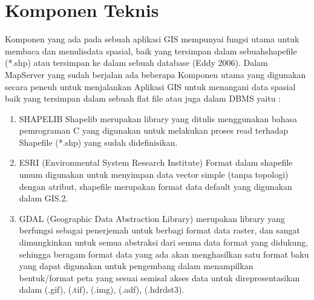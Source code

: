 \section{Komponen Teknis}
Komponen yang ada pada sebuah aplikasi GIS mempunyai fungsi utama untuk membaca dan menulisdata spasial, baik yang tersimpan dalam sebuahshapefile (*.shp) atau tersimpan ke dalam sebuah database (Eddy 2006).
Dalam MapServer yang sudah berjalan ada beberapa Komponen utama yang digunakan secara peneuh untuk menjalankan Aplikasi GIS untuk menangani data spasial baik yang tersimpan dalam sebuah flat file atau juga dalam DBMS yaitu :
\begin{enumerate}
\item SHAPELIB
\subitem Shapelib merupakan library yang ditulis menggunakan bahasa pemrograman C yang digunakan untuk melakukan proses read terhadap Shapefile (*.shp) yang sudah didefinisikan. 

\item ESRI (Environmental System Research Institute)
\subitem Format dalam shapefile umum digunakan untuk menyimpan data vector simple (tanpa topologi) dengan atribut, shapefile merupakan format data default yang digunakan dalam GIS.2.

\item GDAL (Geographic Data Abstraction Library) 
\subitem merupakan library yang berfungsi sebagai penerjemah untuk berbagi format data raster, dan sangat dimungkinkan untuk semua abstraksi dari semua data format yang didukung, sehingga beragam format data yang ada akan menghasilkan satu format baku yang dapat digunakan untuk pengembang dalam menampilkan bentuk/format peta yang sesuai semisal akses data untuk direpresentasikan dalam (.gif), (.tif), (.img), (.adf), (.hdrdst3).
\end{enumerate}


